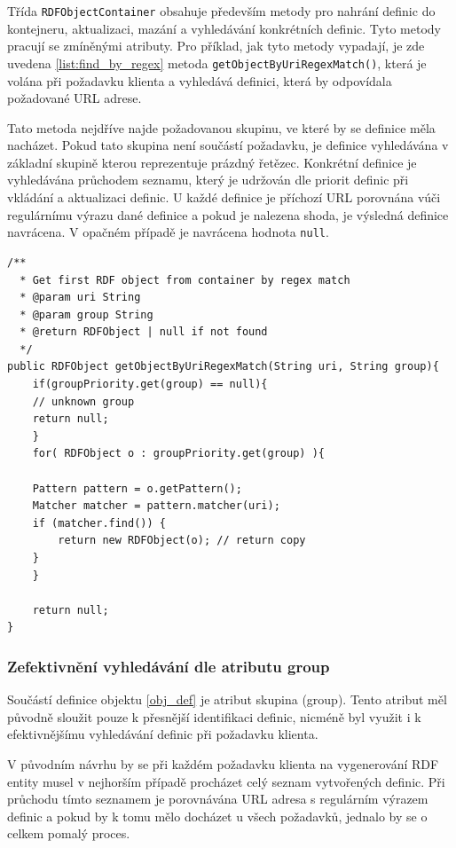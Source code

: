 \documentclass[thesis=B,czech]{FITthesis}[2012/06/26]
\begin{document}
  Třída \texttt{RDFObjectContainer} obsahuje především metody pro nahrání definic do kontejneru, aktualizaci, mazání a vyhledávání konkrétních definic.
  Tyto metody pracují se zmíněnými atributy. Pro příklad, jak tyto metody vypadají, je zde uvedena \ref{list:find_by_regex} metoda \texttt{getObjectByUriRegexMatch()}, která
  je volána při požadavku klienta a vyhledává definici, která by odpovídala požadované URL adrese. 
  
  Tato metoda nejdříve najde požadovanou skupinu, ve které by se 
  definice měla nacházet. Pokud tato skupina není součástí požadavku, je definice vyhledávána v základní skupině kterou reprezentuje prázdný řetězec.
  Konkrétní definice je vyhledávána průchodem seznamu, který je udržován dle priorit definic při vkládání a aktualizaci definic. U každé definice je příchozí URL
  porovnána vúči regulárnímu výrazu dané definice a pokud je nalezena shoda, je výsledná definice navrácena. V opačném případě je navrácena hodnota \texttt{null}.

      \begin{lstlisting}[float=htb,caption={Metoda pro vyhledání definice dle požadované URL adresy},label=list:find_by_regex]
/**
  * Get first RDF object from container by regex match
  * @param uri String
  * @param group String
  * @return RDFObject | null if not found
  */
public RDFObject getObjectByUriRegexMatch(String uri, String group){
    if(groupPriority.get(group) == null){
	// unknown group
	return null;
    }
    for( RDFObject o : groupPriority.get(group) ){

	Pattern pattern = o.getPattern();
	Matcher matcher = pattern.matcher(uri);
	if (matcher.find()) {
	    return new RDFObject(o); // return copy
	}
    }

    return null;
}
\end{lstlisting}
  
  \subsubsection{Zefektivnění vyhledávání dle atributu group}\label{ef_search}
  Součástí definice objektu \ref{obj_def} je atribut skupina (group). Tento atribut měl původně sloužit pouze k přesnější identifikaci definic, nicméně byl využit
  i k efektivnějšímu vyhledávání definic při požadavku klienta.
  
  V původním návrhu by se při každém požadavku klienta na vygenerování RDF entity musel v nejhorším případě procházet celý seznam vytvořených definic.
  Při průchodu tímto seznamem je porovnávána URL adresa s regulárním výrazem definic a pokud by k tomu mělo docházet u všech požadavků, jednalo by se o celkem pomalý proces.
  
\end{document}
